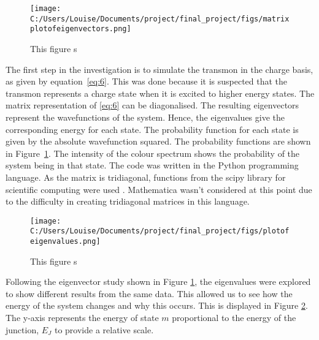 \documentclass[11pt]{article}
\begin{document}
\begin{figure}[ht]
\centering
\texttt{[image: C:/Users/Louise/Documents/project/final\_project/figs/matrixplotofeigenvectors.png]}
\caption{This figure s}
\label{fig:graph1}
\end{figure}
The first step in the investigation is to simulate the transmon in the charge basis, as given by equation~\ref{eq:6}. This was done because it is suspected that the transmon represents a charge state when it is excited to higher energy states. The matrix representation of \ref{eq:6} can be diagonalised. The resulting eigenvectors represent the wavefunctions of the system. Hence, the eigenvalues give the corresponding energy for each state. The probability function for each state is given by the absolute wavefunction squared. The probability functions are shown in Figure~\ref{fig:graph1}. The intensity of the colour spectrum shows the probability of the system being in that state. The code was written in the Python programming language. As the matrix is tridiagonal, functions from the scipy library for scientific computing were used \cite{jonesSciPyOpenSource2001}. Mathematica wasn't considered at this point due to the difficulty in creating tridiagonal matrices in this language.
\begin{figure}[ht]
\centering
\texttt{[image: C:/Users/Louise/Documents/project/final\_project/figs/plotofeigenvalues.png]}
\caption{This figure s}
\label{fig:graph2}
\end{figure}
Following the eigenvector study shown in Figure \ref{fig:graph1}, the eigenvalues were explored to show different results from the same data. This allowed us to see how the energy of the system changes and why this occurs. This is displayed in Figure \ref{fig:graph2}. The y-axis represents the energy of state $m$ proportional to the energy of the junction, $E_J$ to provide a relative scale.
\end{document}
